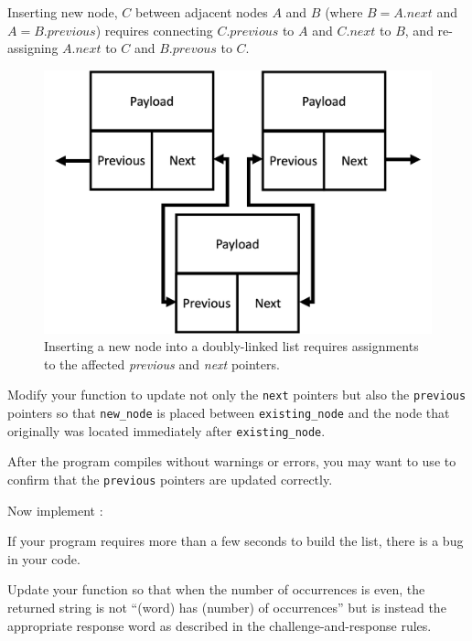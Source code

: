Inserting new node, $C$ between adjacent nodes $A$ and $B$ (where $B = A.next$
and $A = B.previous$) requires connecting $C.previous$ to $A$ and $C.next$ to
$B$, and re-assigning $A.next$ to $C$ and $B.prevous$ to $C$.

\begin{figure}[h]
    \centering
    \includegraphics[scale=0.5]{dll-insertion}
    \caption{Inserting a new node into a doubly-linked list requires assignments to the affected \textit{previous} and \textit{next} pointers.}
\end{figure}

Modify your  function to update not only the
\lstinline{next} pointers but also the \lstinline{previous} pointers so that
\lstinline{new_node} is placed between \lstinline{existing_node} and the node
that originally was located immediately after \lstinline{existing_node}.

After the program compiles without warnings or errors, you may want to use
 to confirm that the \lstinline{previous} pointers are
updated correctly.

Now implement :



If your program requires more than a few seconds to build the list, there is a
bug in your code.

Update your  function so that when the number of
occurrences is even, the returned string is not ``(word) has (number) of
occurrences'' but is instead the appropriate response word as described in the
challenge-and-response rules.

